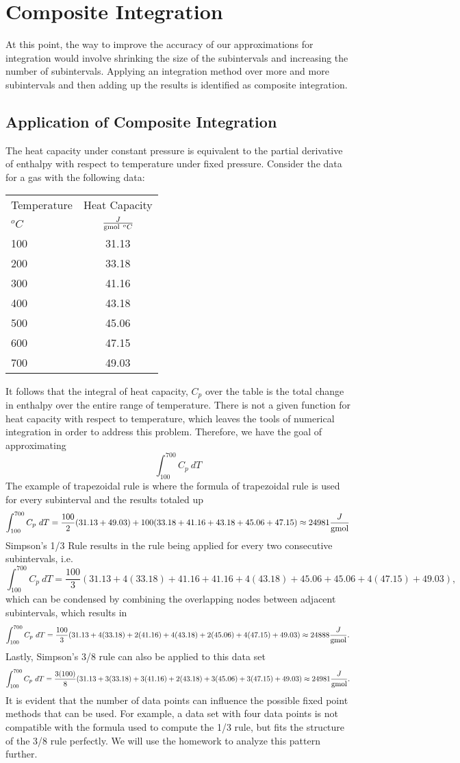 \documentclass[twoside]{article}
\begin{document}
\section{Composite Integration}
At this point, the way to improve the accuracy of our approximations for integration would involve shrinking the size of the subintervals and increasing the number of subintervals. Applying an integration method over more and more subintervals and then adding up the results is identified as composite integration. 
\subsection{Application of Composite Integration}
The heat capacity under constant pressure is equivalent to the partial derivative of enthalpy with respect to temperature under fixed pressure. Consider the data for a gas with the following data: \par 
\begin{tabular}{|l|c|}
\hline
Temperature & Heat Capacity\\
$^oC$ & $\frac J{{\rm gmol}\ ^oC} $\\
\hline
100 & 31.13 \\
\hline
200 & 33.18 \\
\hline
300 & 41.16 \\
\hline
400 & 43.18 \\
\hline
500 & 45.06 \\
\hline
600 & 47.15 \\
\hline
700 & 49.03 \\
\hline
\end{tabular} \par \noindent
It follows that the integral of heat capacity, $C_p$ over the table is the total change in enthalpy over the entire range of temperature. There is not a given function for heat capacity with respect to temperature, which leaves the tools of numerical integration in order to address this problem. Therefore, we have the goal of approximating
$$\int_{100}^{700} C_p \ dT$$
The example of trapezoidal rule is where the formula of trapezoidal rule is used for every subinterval and the results totaled up
$$\int_{100}^{700} C_p \ dT = \frac {100}2 ( 31.13 + 49.03) + 100(33.18+41.16+43.18+45.06+47.15) \approx 24981 \frac J{{\rm gmol}}$$
Simpson's 1/3 Rule results in the rule being applied for every two consecutive subintervals, i.e.
$$\int_{100}^{700} C_p \ dT = \frac {100}3 ( 31.13  + 4(33.18)+41.16+41.16+4(43.18)+45.06+45.06 +4(47.15)+49.03), $$
which can be condensed by combining the overlapping nodes between adjacent subintervals, which results in 
$$\int_{100}^{700} C_p \ dT = \frac {100}3 ( 31.13  + 4(33.18)+2(41.16)+4(43.18)+2(45.06) +4(47.15)+49.03) \approx 24888 \frac J{{\rm gmol}}.$$
Lastly, Simpson's 3/8 rule can also be applied to this data set
$$\int_{100}^{700} C_p \ dT = \frac {3(100)}8 ( 31.13  + 3(33.18)+3(41.16)+2(43.18)+3(45.06) +3(47.15)+49.03) \approx 24981 \frac J{{\rm gmol}}.$$
It is evident that the number of data points can influence the possible fixed point methods that can be used. For example, a data set with four data points is not compatible with the formula used to compute the 1/3 rule, but fits the structure of the 3/8 rule perfectly. We will use the homework to analyze this pattern further. 
\end{document}
